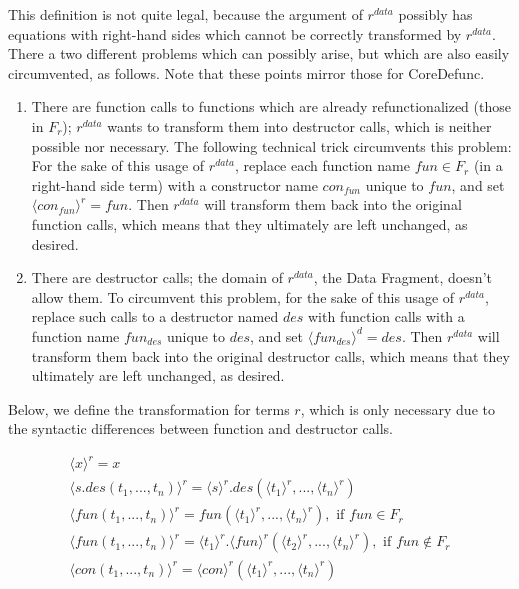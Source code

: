 \begin{algorithm}
This definition is not quite legal, because the argument of $r^{data}$ possibly has equations with right-hand sides which cannot be correctly transformed by $r^{data}$. There a two different problems which can possibly arise, but which are also easily circumvented, as follows. Note that these points mirror those for \textsf{CoreDefunc}.
\begin{enumerate}
\item There are function calls to functions which are already refunctionalized (those in $F_r$); $r^{data}$ wants to transform them into destructor calls, which is neither possible nor necessary. The following technical trick circumvents this problem: For the sake of this usage of $r^{data}$, replace each function name $fun \in F_r$ (in a right-hand side term) with a constructor name $con_{fun}$ unique to $fun$, and set $\langle con_{fun} \rangle^r = fun$. Then $r^{data}$ will transform them back into the original function calls, which means that they ultimately are left unchanged, as desired.
\item There are destructor calls; the domain of $r^{data}$, the Data Fragment, doesn't allow them. To circumvent this problem, for the sake of this usage of $r^{data}$, replace such calls to a destructor named $des$ with function calls with a function name $fun_{des}$ unique to $des$, and set $\langle fun_{des} \rangle^d = des$. Then $r^{data}$ will transform them back into the original destructor calls, which means that they ultimately are left unchanged, as desired.
\end{enumerate}

Below, we define the transformation for terms $r$, which is only necessary due to the syntactic differences between function and destructor calls.

\begin{align*}
\langle x \rangle^r = x \\
\langle s.des(t_1, ..., t_n) \rangle^r = \langle s \rangle^r .des(\langle t_1 \rangle^r, ..., \langle t_n \rangle^r) \\
\langle fun(t_1, ..., t_n) \rangle^r = fun(\langle t_1 \rangle^r, ..., \langle t_n \rangle^r), \text{ if } fun \in F_r \\
\langle fun(t_1, ..., t_n) \rangle^r = \langle t_1 \rangle^r .\langle fun \rangle^r (\langle t_2 \rangle^r, ..., \langle t_n \rangle^r), \text{ if } fun \not\in F_r \\
\langle con(t_1, ..., t_n) \rangle^r = \langle con \rangle^r (\langle t_1 \rangle^r, ..., \langle t_n \rangle^r)
\end{align*}

\end{algorithm}

